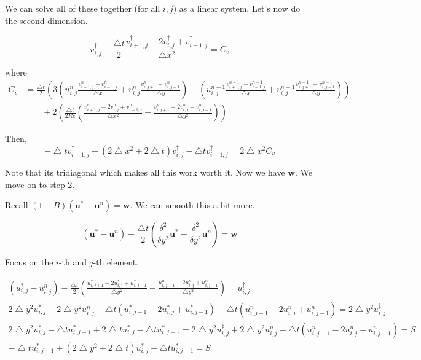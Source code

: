 \documentclass[12pt]{article}
\begin{document}
We can solve all of these together (for all $i,j$) as a linear system. Let's now do the second dimension.

\begin{equation}
    v^\dagger_{i,j} - \frac{\bigtriangleup t}{2} \frac{v^\dagger_{i+1,j} - 2v^\dagger_{i,j} + v^\dagger_{i-1,j}}{\bigtriangleup x^2} = C_v
\end{equation}

where
\begin{align*}
    C_v &= \frac{\bigtriangleup t}{2}(3(u^n_{i,j}\frac{v^n_{i+1,j} - v^n_{i-1,j}}{\bigtriangleup x} + v^n_{i,j}\frac{v^n_{i,j+1} - v^n_{i,j-1}}{\bigtriangleup y}) - (u^{n-1}_{i,j}\frac{v^{n-1}_{i+1,j} - v^{n-1}_{i-1,j}}{\bigtriangleup x} + v^{n-1}_{i,j}\frac{v^{n-1}_{i,j+1} - v^{n-1}_{i,j-1}}{\bigtriangleup y})) \\
    & \qquad + 2(\frac{\bigtriangleup t}{2 Re}(\frac{v^n_{i+1,j} -2v^n_{i,j} + v^n_{i-1,j}}{\bigtriangleup x^2} + \frac{v^n_{i,j+1} -2v^n_{i,j} + v^n_{i,j-1}}{\bigtriangleup y^2}))
\end{align*}

Then,
\begin{equation}
    - \bigtriangleup t v^\ddagger_{i+1,j} + (2\bigtriangleup x^2 + 2\bigtriangleup t)v^\ddagger_{i,j} - \bigtriangleup t v^\ddagger_{i-1,j} = 2\bigtriangleup x^2 C_v
\end{equation}

Note that its tridiagonal which makes all this work worth it. Now we have $\mathbf{w}$. We move on to step 2.

Recall $(1 - B)(\mathbf{u}^* - \mathbf{u}^n) = \mathbf{w}$. We can smooth this a bit more.

\begin{equation}
    (\mathbf{u}^* - \mathbf{u}^n) - \frac{\bigtriangleup t}{2}(\frac{\delta^2}{\delta y^2} \mathbf{u}^* - \frac{\delta^2}{\delta y^2} \mathbf{u}^n) = \mathbf{w}
\end{equation}

Focus on the $i$-th and $j$-th element.

\begin{align*}
    (u^*_{i,j} - u^n_{i,j}) - \frac{\bigtriangleup t}{2}(\frac{u^*_{i,j+1} - 2u^*_{i,j} + u^*_{i,j-1}}{\bigtriangleup y^2} - \frac{u^n_{i,j+1} - 2u^n_{i,j} + u^n_{i,j-1}}{\bigtriangleup y^2}) = u^\ddagger_{i,j} \\
    2\bigtriangleup y^2 u^*_{i,j} - 2\bigtriangleup y^2 u^n_{i,j} - \bigtriangleup t(u^*_{i,j+1} - 2u^*_{i,j} + u^*_{i,j-1}) + \bigtriangleup t(u^n_{i,j+1} - 2u^n_{i,j} + u^n_{i,j-1}) = 2\bigtriangleup y^2 u^\ddagger_{i,j} \\
    2\bigtriangleup y^2 u^*_{i,j} - \bigtriangleup t u^*_{i,j+1} + 2\bigtriangleup t u^*_{i,j} - \bigtriangleup t u^*_{i,j-1} = 2\bigtriangleup y^2 u^\ddagger_{i,j} + 2\bigtriangleup y^2 u^n_{i,j} - \bigtriangleup t(u^n_{i,j+1} - 2u^n_{i,j} + u^n_{i,j-1}) = S \\
    -\bigtriangleup t u^*_{i,j+1} + (2\bigtriangleup y^2 + 2\bigtriangleup t)u^*_{i,j} - \bigtriangleup t u^*_{i,j-1} = S
\end{align*}
\end{document}
